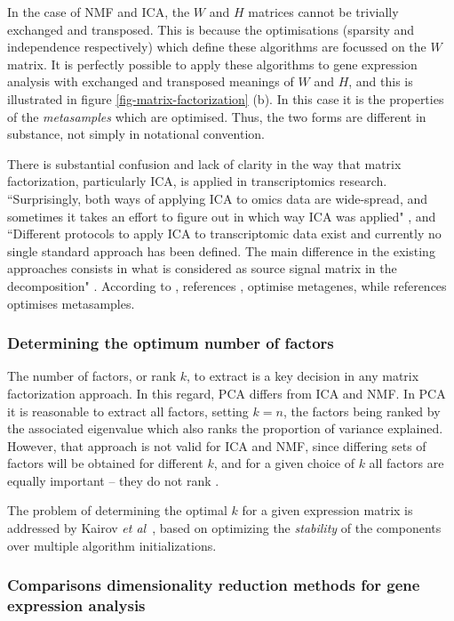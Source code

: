 \documentclass[tikz, 11pt,a4paper,oneside,fleqn]{article}
\newcommand{\etal}{{\em et al\/}}
\begin{document}
In the case of NMF and ICA, the $W$ and $H$ matrices cannot be trivially exchanged and transposed.  This is because the optimisations (sparsity and independence respectively) which define these algorithms are focussed on the $W$ matrix.  It is perfectly possible to apply these algorithms to gene expression analysis with exchanged and transposed meanings of $W$ and $H$, and this is illustrated in figure \ref{fig-matrix-factorization} (b).  In this case it is the properties of the \emph{metasamples} which are optimised.  Thus, the two forms are different in substance, not simply in notational convention.

There is substantial confusion and lack of clarity in the way that matrix factorization, particularly ICA, is applied in transcriptomics research.  
``Surprisingly, both ways of applying ICA to omics data are wide-spread, and sometimes it takes an effort to figure out in which way ICA was applied" \cite{Sompairac2019}, and ``Different protocols to apply ICA to transcriptomic data exist and currently no single standard approach has been defined. The main difference in the existing approaches consists in what is considered as source signal matrix in the decomposition" \cite{Cantini2019}.  
According to \cite{Cantini2019}, references \cite{Au-Yeung2014,Kairov2017,Kong2008,Lee2003},  optimise metagenes, while references \cite{Meng2016,Barillot2013} optimises metasamples.


\subsubsection{Determining the optimum number of factors}

The number of factors, or rank $k$, to extract is a key decision in any matrix factorization approach.  In this regard, PCA differs from ICA and NMF.  In PCA it is reasonable to extract all factors, setting $k=n$, the factors being ranked by the associated eigenvalue which also ranks the proportion of variance explained.   However, that approach is not valid for ICA and NMF, since differing sets of factors will be obtained for different $k$, and for a given choice of $k$ all factors are equally important -- they do not rank \cite{Stein-OBrien2018}.

The problem of determining the optimal $k$ for a given expression matrix is addressed  by Kairov \etal\ \cite{Kairov2017}, based on optimizing the \emph{stability} of the components over multiple algorithm initializations.

\subsubsection{Comparisons dimensionality reduction methods for gene expression analysis}
\label{sec-comparative-dimensionality-studies}
\end{document}
